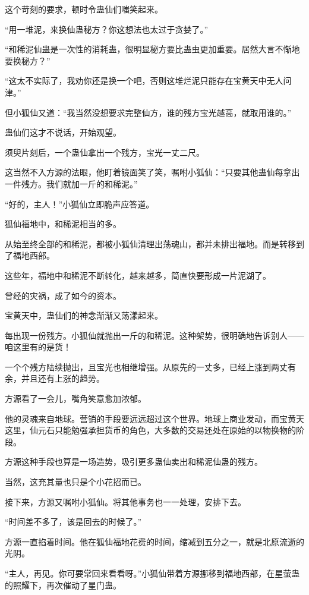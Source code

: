 \begin{this_body}
这个苛刻的要求，顿时令蛊仙们嗤笑起来。

“用一堆泥，来换仙蛊秘方？你这想法也太过于贪婪了。”

“和稀泥仙蛊是一次性的消耗蛊，很明显秘方要比蛊虫更加重要。居然大言不惭地要换秘方？”

“这太不实际了，我劝你还是换一个吧，否则这堆烂泥只能存在宝黄天中无人问津。”

但小狐仙又道：“我当然没想要求完整仙方，谁的残方宝光越高，就取用谁的。”

蛊仙们这才不说话，开始观望。

须臾片刻后，一个蛊仙拿出一个残方，宝光一丈二尺。

这当然不入方源的法眼，他盯着镜面笑了笑，嘱咐小狐仙：“只要其他蛊仙每拿出一件残方。我们就加一斤的和稀泥。”

“好的，主人！”小狐仙立即脆声应答道。

狐仙福地中，和稀泥相当的多。

从始至终全部的和稀泥，都被小狐仙清理出荡魂山，都并未排出福地。而是转移到了福地西部。

这些年，福地中和稀泥不断转化，越来越多，简直快要形成一片泥湖了。

曾经的灾祸，成了如今的资本。

宝黄天中，蛊仙们的神念渐渐又荡漾起来。

每出现一份残方。小狐仙就抛出一斤的和稀泥。这种架势，很明确地告诉别人——咱这里有的是货！

一个个残方陆续抛出，且宝光也相继增强。从原先的一丈多，已经上涨到两丈有余，并且还有上涨的趋势。

方源看了一会儿，嘴角笑意愈加浓郁。

他的灵魂来自地球。营销的手段要远远超过这个世界。地球上商业发动，而宝黄天这里，仙元石只能勉强承担货币的角色，大多数的交易还处在原始的以物换物的阶段。

方源这种手段也算是一场造势，吸引更多蛊仙卖出和稀泥仙蛊的残方。

当然，这充其量也只是个小花招而已。

接下来，方源又嘱咐小狐仙。将其他事务也一一处理，安排下去。

“时间差不多了，该是回去的时候了。”

方源一直掐着时间。他在狐仙福地花费的时间，缩减到五分之一，就是北原流逝的光阴。

“主人，再见。你可要常回来看看呀。”小狐仙带着方源挪移到福地西部，在星萤蛊的照耀下，再次催动了星门蛊。


\end{this_body}
